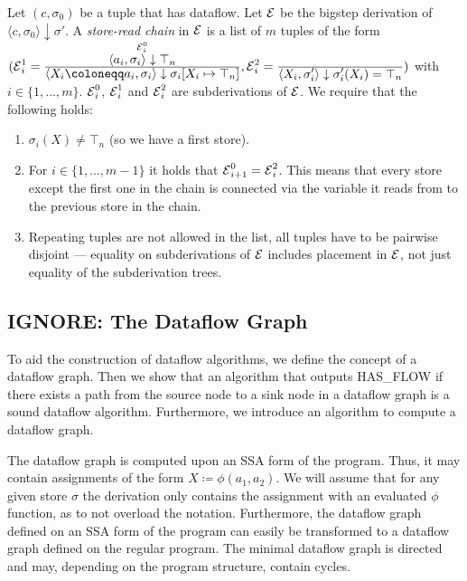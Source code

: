 \begin{definition}
    Let $(c, \sigma_0)$ be a tuple that has dataflow.
    Let $\operatorname{\mathcal{E}}$ be the bigstep derivation of
    $\langle c, \sigma_0 \rangle \downarrow \sigma'$.
    A \emph{store-read chain} in $\operatorname{\mathcal{E}}$ is a list of $m$ tuples of the form
    $(\E^1_i=\ddfrac{\overset{\E^0_i}{\langle a_i, \sigma_i \rangle \downarrow \top_n}}
    {\langle X_i \coloneqq a_i, \sigma_i \rangle \downarrow \sigma_i[X_i \mapsto \top_n]},
    \E^2_i=\ddfrac{}{\langle X_i, \sigma_i' \rangle \downarrow \sigma_i'(X_i) = \top_n})$
    with $i \in \{1, \ldots, m\}$.
    $\operatorname{\mathcal{E}}^0_i$, $\operatorname{\mathcal{E}}^1_i$ and $\operatorname{\mathcal{E}}^2_i$ are subderivations of $\operatorname{\mathcal{E}}$.
    We require that the following holds:
    \begin{enumerate}
        \item $\sigma_i(X) \neq \top_n$ (so we have a first store). 
        \item For $i \in \{1, \ldots, m-1\}$ it holds that 
        $\operatorname{\mathcal{E}}^0_{i+1}=\operatorname{\mathcal{E}}^2_i$. This means that every store except the first one
        in the chain is connected via the variable it reads from to the previous 
        store in the chain.
        \item Repeating tuples are not allowed in the list, all tuples have to 
        be pairwise disjoint --- equality on subderivations of $\operatorname{\mathcal{E}}$ includes
        placement in $\operatorname{\mathcal{E}}$, not just equality of the subderivation trees.
    \end{enumerate}
\end{definition}


\subsection{IGNORE: The Dataflow Graph}
To aid the construction of dataflow algorithms, we define the concept
of a dataflow graph.
Then we show that an algorithm that outputs HAS\_FLOW if 
there exists a path from the source 
node to a sink node in a dataflow graph %
is a sound dataflow algorithm.
Furthermore, we introduce an algorithm to compute a dataflow graph.

The dataflow graph is computed upon an SSA form of the program.
Thus, it may contain assignments of the form $X \coloneqq \phi(a_1, a_2)$.
We will assume that for any given store $\sigma$ the derivation only contains 
the assignment with an evaluated $\phi$ function, as to not overload the notation.
Furthermore, the dataflow graph defined on an SSA form of the program can easily 
be transformed to a dataflow graph defined on the regular program.
The minimal dataflow graph is directed and may, depending on the 
program structure, contain cycles.

